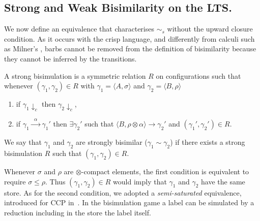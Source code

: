 \documentclass[main.tex]{subfiles}
\begin{document}
\subsection{Strong and Weak Bisimilarity on the LTS.}
We now define an equivalence that
characterises  $\sim_{\mathit{s}}$ without the upward closure condition. 
As it occurs with the crisp language, and differently from calculi such as Milner's \CCS, 
barbs cannot be removed
from the definition of bisimilarity because they cannot be inferred by the transitions.


\begin{definition}\label{def:strong} 
A strong bisimulation is a symmetric relation $R$
on configurations such that whenever $(\gamma_1, \gamma_2) \in R$ with $\gamma_1 = \langle A, \sigma \rangle$ and $\gamma_2 = \langle B, \rho\rangle$
\begin{enumerate}
\item if $\gamma_1 \downarrow_c$ then $\gamma_2 \downarrow_c$,
\item if $\gamma_1 \xrightarrow{\; \; \alpha\;  \;} \gamma_1'$ then $\exists \gamma_2'$
such that $\langle B, \rho \otimes \alpha \rangle \longrightarrow \gamma_2'$ and $(\gamma_1', \gamma_2') \in R$.
\end{enumerate}
We say that $\gamma_1$ and $\gamma_2$ are strongly bisimilar ($\gamma_1 \sim \gamma_2$) if there exists a strong
bisimulation $R$ such that $(\gamma_1, \gamma_2) \in R$.
\end{definition}

Whenever $\sigma$ and $\rho$ are $\otimes$-compact elements, the first condition is equivalent to require $\sigma \leq \rho.$ 
%
Thus $(\gamma_1, \gamma_2) \in R$ would
 imply that $\gamma_1$ and $\gamma_2$ have the same store.
 As for the second condition, we adopted a \emph{semi-saturated} equivalence, introduced 
 for CCP in~\cite{pippo}. In the bisimulation game a label can  be simulated 
 by a reduction including in the store the label itself.
\end{document}

